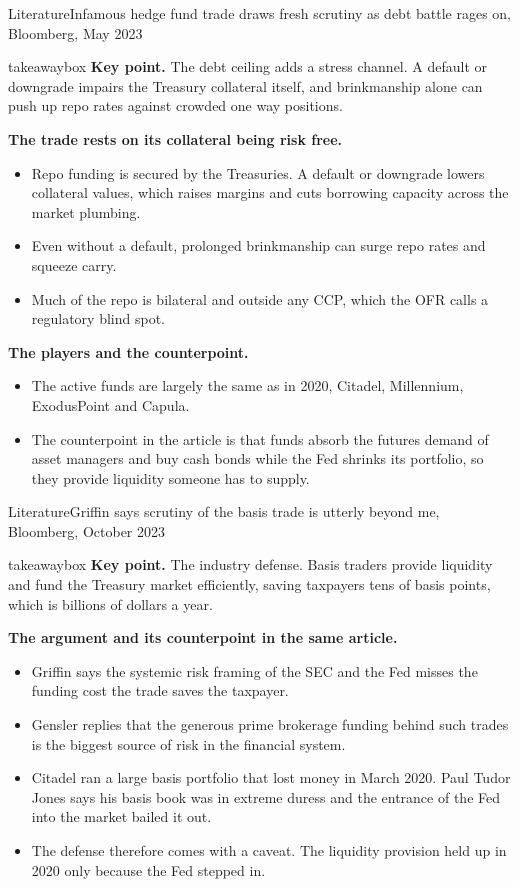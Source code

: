 \documentclass[aspectratio=169,11pt]{beamer}
\newcommand{\keypoint}[1]{%
  \begin{beamercolorbox}[sep=0.6em,wd=\textwidth]{takeawaybox}
    \textbf{Key point.} #1
  \end{beamercolorbox}}
\begin{document}
\begin{frame}{Literature}{Infamous hedge fund trade draws fresh scrutiny as debt battle rages on, Bloomberg, May 2023}
  \footnotesize
  \keypoint{The debt ceiling adds a stress channel. A default or downgrade impairs the Treasury collateral itself, and brinkmanship alone can push up repo rates against crowded one way positions.}
  \medskip
  \textbf{The trade rests on its collateral being risk free.}
  \begin{itemize}
    \item Repo funding is secured by the Treasuries. A default or downgrade lowers collateral values, which raises margins and cuts borrowing capacity across the market plumbing.
    \item Even without a default, prolonged brinkmanship can surge repo rates and squeeze carry.
    \item Much of the repo is bilateral and outside any CCP, which the OFR calls a regulatory blind spot.
  \end{itemize}
  \smallskip
  \textbf{The players and the counterpoint.}
  \begin{itemize}
    \item The active funds are largely the same as in 2020, Citadel, Millennium, ExodusPoint and Capula.
    \item The counterpoint in the article is that funds absorb the futures demand of asset managers and buy cash bonds while the Fed shrinks its portfolio, so they provide liquidity someone has to supply.
  \end{itemize}
\end{frame}


\begin{frame}{Literature}{Griffin says scrutiny of the basis trade is utterly beyond me, Bloomberg, October 2023}
  \footnotesize
  \keypoint{The industry defense. Basis traders provide liquidity and fund the Treasury market efficiently, saving taxpayers tens of basis points, which is billions of dollars a year.}
  \medskip
  \textbf{The argument and its counterpoint in the same article.}
  \begin{itemize}
    \item Griffin says the systemic risk framing of the SEC and the Fed misses the funding cost the trade saves the taxpayer.
    \item Gensler replies that the generous prime brokerage funding behind such trades is the biggest source of risk in the financial system.
    \item Citadel ran a large basis portfolio that lost money in March 2020. Paul Tudor Jones says his basis book was in extreme duress and the entrance of the Fed into the market bailed it out.
    \item The defense therefore comes with a caveat. The liquidity provision held up in 2020 only because the Fed stepped in.
  \end{itemize}
\end{frame}
\end{document}
